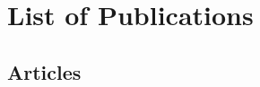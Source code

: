 \chapter*{List of Publications}

%
%
\newcommand{\myPaper}[4]
{%
\item \textsc{#1}, \emph{#2}, #3 \href{http://dx.doi.org/#4}{http://dx.doi.org/#4}
}
\newcommand{\myConf}[4]
{%
\item \textsc{#1}, \emph{#2}\\#3, (#4)
}
\section*{Articles}
